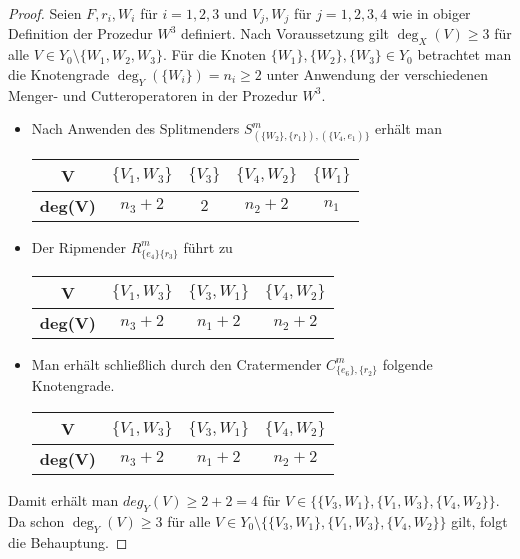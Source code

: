 \documentclass[12pt,titlepage]{article}
\begin{document}
\begin{proof}
Seien $F,r_i,W_i$ für $i=1,2,3$ und $V_j,W_j$ für $j=1,2,3,4$ wie in obiger Definition der Prozedur $W^3$ definiert. Nach Voraussetzung gilt $\deg_X(V)\geq 3$ für alle $V \in Y_0\setminus \{W_1,W_2,W_3\}$. Für die Knoten $\{W_1\},\{W_2\},\{W_3\}\in Y_0$ betrachtet man die Knotengrade $\deg_Y(\{W_i\})=n_i\geq 2$ unter Anwendung der verschiedenen Menger- und Cutteroperatoren in der Prozedur $W^3$.
\begin{itemize}
\item Nach Anwenden des Splitmenders $S^m_{(\{W_2\},\{r_1\}),(\{V_4,e_1)\}}$ erhält man
\begin{center}
\begin{tabular}{|c|c|c|c|c|}
\hline
 \textbf{V} & $\{V_1,W_3 \}$ & $\{V_3\}$ & $\{V_4,W_2\}$ & $\{W_1\}$   \\ 
  \hline
   \textbf{deg(V)} & $n_3+2$ & $2$ & $n_2+2$ & $n_1$  \\  
   \hline
 \end{tabular}
 \end{center}
\item Der Ripmender $R^m_{\{e_4\}\{r_3\}}$ führt zu
\begin{center}
\begin{tabular}{|c|c|c|c|}
\hline
\textbf{V} & $\{V_1,W_3 \}$ & $\{V_3,W_1\}$ & $\{V_4,W_2\}$    \\ 
  \hline
   \textbf{deg(V)} & $n_3+2$ & $n_1+2$ & $n_2+2$   \\  
   \hline
 \end{tabular}
 \end{center}
\item Man erhält schließlich durch den Cratermender $C^m_{\{e_6\},\{r_2\}}$ folgende Knotengrade.
\begin{center}
\begin{tabular}{|c|c|c|c|}
\hline
 \textbf{V} & $\{V_1,W_3 \}$ & $\{V_3,W_1\}$ & $\{V_4,W_2\}$   \\ 
  \hline
   \textbf{deg(V)} & $n_3+2$ & $n_1+2$ & $n_2+2$   \\  
   \hline
 \end{tabular}
 \end{center}
\end{itemize}
Damit erhält man $deg_Y(V)\geq 2+2=4$ für $V \in \{\{V_3,W_1\},\{V_1,W_3 \},\{V_4,W_2\}\}$. Da schon $\deg_Y(V)\geq 3$ für alle $V \in Y_0\setminus \{\{V_3,W_1\},\{V_1,W_3 \},\{V_4,W_2\}\}$ gilt, folgt die Behauptung.
\end{proof}
\end{document}
